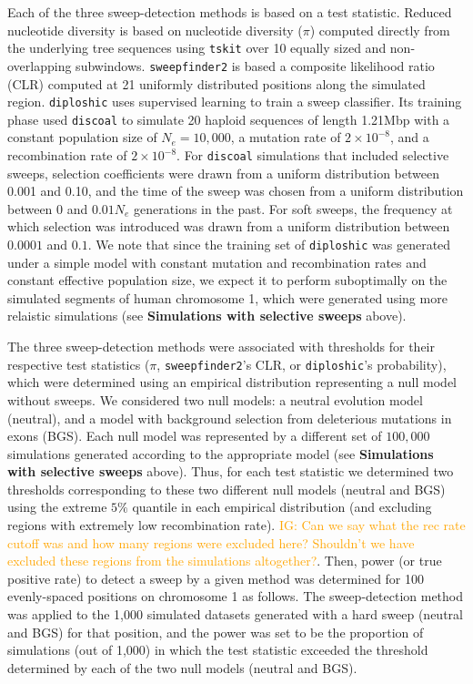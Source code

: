 \documentclass[hidelinks]{article}
\newcommand{\tskit}{\texttt{tskit}\xspace}
\newcommand{\sweepfinder}{\texttt{sweepfinder2}\xspace}
\newcommand{\diploshic}{\texttt{diploshic}\xspace}
\newcommand{\igcomment}[1]{\textcolor{orange}{IG: #1}}
\begin{document}
    Each of the three sweep-detection methods is based on a test statistic.
    Reduced nucleotide diversity is based on nucleotide diversity  ($\pi$) 
    computed directly from the underlying tree sequences using \tskit \citep{ralph2020efficiently}
    over 10 equally sized and non-overlapping subwindows.
    \sweepfinder \citep{degiorgio2016sweepfinder2} is based a composite likelihood ratio (CLR) 
    computed at 21 uniformly distributed positions along the simulated region.
    \diploshic \citep{kern2018diplos} uses supervised learning to train a sweep classifier.
    Its training phase used \texttt{discoal} \citep{kern2016discoal} to simulate 20 haploid sequences of length 1.21Mbp
    with a constant population size of $N_e=10,000$, a mutation rate of $2\times 10^{-8}$, and a recombination rate of $2\times 10^{-8}$.
    For \texttt{discoal} simulations that included selective sweeps,
    selection coefficients were drawn from a uniform distribution between 0.001 and 0.10,
    and the time of the sweep was chosen from a uniform distribution between 0 and $0.01N_e$ generations in the past.
    For soft sweeps, the frequency at which selection was introduced was drawn from a uniform distribution between $0.0001$ and $0.1$.
    We note that since the training set of \diploshic was generated under a simple model with
    constant mutation and recombination rates and constant effective population size,
    we expect it to perform suboptimally on the simulated segments of human chromosome 1,
    which were generated using more relaistic simulations (see \textbf{Simulations with selective sweeps} above).

    The three sweep-detection methods were associated with thresholds for their respective test statistics
    ($\pi$, \sweepfinder's CLR, or \diploshic's probability),
    which were determined using an empirical distribution representing a null model without sweeps.
    We considered two null models: a neutral evolution model (neutral),
    and a model with background selection from deleterious mutations in exons (BGS).
    Each null model was represented by a different set of $100,000$ simulations generated according to the appropriate model
    (see \textbf{Simulations with selective sweeps} above).
    Thus, for each test statistic we determined two thresholds corresponding to these two different null models (neutral and BGS)
    using the extreme $5\%$ quantile in each empirical distribution (and excluding regions with extremely low recombination rate).
    \igcomment{Can we say what the rec rate cutoff was and how many regions were excluded here?
    Shouldn't we have excluded these regions from the simulations altogether?}.
    Then, power (or true positive rate) to detect a sweep by a given method was determined for
    100 evenly-spaced positions on chromosome 1 as follows.
    The sweep-detection method was applied to the 1,000 
    simulated datasets generated with a hard sweep (neutral and BGS) for that position,
    and the power was set to be the proportion of simulations (out of 1,000)
    in which the test statistic exceeded the threshold determined by each of the two null models (neutral and BGS).
\end{document}
